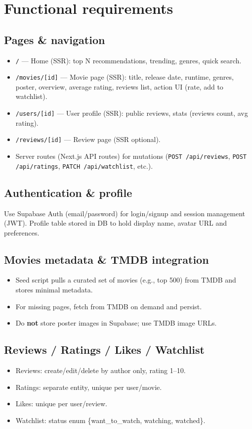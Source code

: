 \documentclass[11pt,a4paper]{article}
\begin{document}
\section{Functional requirements}
\subsection{Pages \& navigation}
\begin{itemize}
  \item \texttt{/} — Home (SSR): top N recommendations, trending, genres, quick search.
  \item \texttt{/movies/[id]} — Movie page (SSR): title, release date, runtime, genres, poster, overview, average rating, reviews list, action UI (rate, add to watchlist).
  \item \texttt{/users/[id]} — User profile (SSR): public reviews, stats (reviews count, avg rating).
  \item \texttt{/reviews/[id]} — Review page (SSR optional).
  \item Server routes (Next.js API routes) for mutations (\texttt{POST /api/reviews}, \texttt{POST /api/ratings}, \texttt{PATCH /api/watchlist}, etc.).
\end{itemize}

\subsection{Authentication \& profile}
Use Supabase Auth (email/password) for login/signup and session management (JWT). Profile table stored in DB to hold display name, avatar URL and preferences.

\subsection{Movies metadata \& TMDB integration}
\begin{itemize}
  \item Seed script pulls a curated set of movies (e.g., top 500) from TMDB and stores minimal metadata.
  \item For missing pages, fetch from TMDB on demand and persist.
  \item Do \textbf{not} store poster images in Supabase; use TMDB image URLs.
\end{itemize}

\subsection{Reviews / Ratings / Likes / Watchlist}
\begin{itemize}
  \item Reviews: create/edit/delete by author only, rating 1--10.
  \item Ratings: separate entity, unique per user/movie.
  \item Likes: unique per user/review.
  \item Watchlist: status enum \{want\_to\_watch, watching, watched\}.
\end{itemize}
\end{document}
